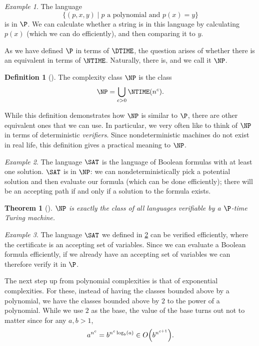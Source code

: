 \documentclass[english,12pt]{reedthesis}
\theoremstyle{plain}
\newtheorem{thm}{Theorem}[section]
\theoremstyle{definition}
\newtheorem{defn}[defn]{Definition}
\theoremstyle{remark}
\newtheorem{example}{Example}[thm]
\begin{document}
\begin{example}\label{ex:polynomial-is-p}
  The language
  \[
    \{(p, x, y) \mid p \text{ a polynomial and } p(x) = y\}
  \]
  is in $\P$. We can calculate whether a string is in this language by
  calculating $p(x)$ (which we can do efficiently), and then comparing it to
  $y$.
\end{example}

As we have defined $\P$ in terms of $\DTIME$, the question arises of whether
there is an equivalent in terms of $\NTIME$. Naturally, there is, and we call it
$\NP$.

\begin{defn}[{\cite[Cor.\ 7.22]{Sip97}}]\label{def:np}
  The complexity class $\NP$ is the class
  \[
    \NP = \bigcup_{c > 0}\NTIME(n^{c}).
  \]
\end{defn}

While this definition demonstrates how $\NP$ is similar to $\P$, there are other
equivalent ones that we can use. In particular, we very often like to think of
$\NP$ in terms of deterministic \emph{verifiers}. Since nondeterministic
machines do not exist in real life, this definition gives a practical meaning to
$\NP$.

\begin{example}\label{ex:sat-is-np}
  The language $\SAT$ is the language of Boolean formulas with at least one
  solution. $\SAT$ is in $\NP$: we can nondeterministically pick a potential
  solution and then evaluate our formula (which can be done efficiently); there
  will be an accepting path if and only if a solution to the formula exists.
\end{example}

\begin{thm}[{\cite[Def.\ 7.19]{Sip97}}]\label{thm:np-verifier}
  $\NP$ is exactly the class of all languages verifiable by a $\P$-time Turing
  machine.
\end{thm}

\begin{example}\label{ex:sat-np-verifier}
  The language $\SAT$ we defined in \cref{ex:sat-is-np} can be verified
  efficiently, where the certificate is an accepting set of variables. Since we
  can evaluate a Boolean formula efficiently, if we already have an accepting
  set of variables we can therefore verify it in $\P$.
\end{example}

The next step up from polynomial complexities is that of exponential
complexities. For these, instead of having the classes bounded above by a
polynomial, we have the classes bounded above by $2$ to the power of a
polynomial. While we use $2$ as the base, the value of the base turns out not to
matter since for any $a, b > 1$,
\begin{equation}
  a^{n^{c}} = b^{n^{c}\log_{b}(a)} \in O\mleft(b^{n^{c+1}}\mright).
\end{equation}
\end{document}

